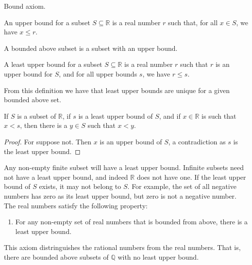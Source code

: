 \documentclass[crop=false,class=book,oneside]{standalone}
\begin{document}
            Bound axiom.
            \begin{definition}
                An upper bound for a subset $S\subseteq\mathbb{R}$
                is a real number $r$ such that, for all $x\in{S}$,
                we have $x\leq{r}$.
            \end{definition}
            A bounded above subset is a subset with an upper bound.
            \begin{definition}
                A least upper bound for a subset
                $S\subseteq\mathbb{R}$ is a real number $r$ such
                that $r$ is an upper bound
                for $S$, and for all upper bounds $s$, we have
                $r\leq{s}$.
            \end{definition}
            From this definition we have that least upper bounds are
            unique for a given bounded above set.
            \begin{theorem}
                If $S$ is a subset of $\mathbb{R}$, if $s$ is a
                least upper bound of $S$, and if $x\in\mathbb{R}$
                is such that $x<s$, then there is a $y\in{S}$
                such that $x<y$.
            \end{theorem}
            \begin{proof}
                For suppose not. Then $x$ is an upper bound of $S$,
                a contradiction as $s$ is the least upper bound.
            \end{proof}
            Any non-empty finite subset will have a least
            upper bound. Infinite subsets need not have a least
            upper bound, and indeed $\mathbb{R}$ does not have
            one. If the least upper bound of $S$ exists, it may
            not belong to $S$. For example, the set of all
            negative numbers has zero as its least upper bound,
            but zero is not a negative number. The real
            numbers satisfy the following property:
            \begin{enumerate}
                \item For any non-empty set of real numbers that
                      is bounded from above, there is a least
                      upper bound.
            \end{enumerate}
            This axiom distringuishes the rational numbers from the
            real numbers. That is, there are bounded above subsets
            of $\mathbb{Q}$ with no least upper bound.
\end{document}
